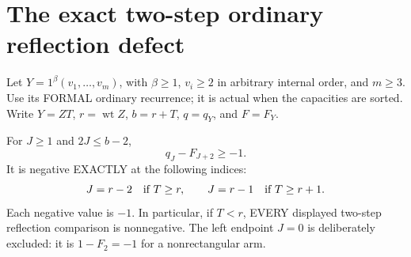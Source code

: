 \section{The exact two-step ordinary reflection defect}
Let $Y=1^\beta(v_1,\ldots,v_m)$, with $\beta\ge1$,
$v_i\ge2$ in arbitrary internal order, and $m\ge3$.
Use its FORMAL ordinary recurrence; it is actual when
the capacities are sorted. Write $Y=ZT$, $r=\operatorname{wt}Z$,
$b=r+T$, $q=q_Y$, and $F=F_Y$.

\begin{theorem}
For $J\ge1$ and $2J\le b-2$,
\[
                    q_J-F_{J+2}\ge-1.
\]
It is negative EXACTLY at the following indices:
\[
 J=r-2\quad\hbox{if }T\ge r,\qquad
 J=r-1\quad\hbox{if }T\ge r+1.
\]
Each negative value is $-1$. In particular, if $T<r$,
EVERY displayed two-step reflection comparison is nonnegative.
The left endpoint $J=0$ is deliberately excluded: it is
$1-F_2=-1$ for a nonrectangular arm.
\end{theorem}

